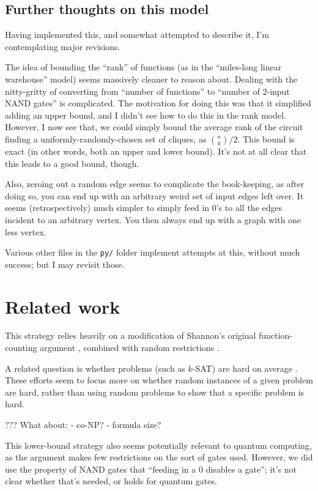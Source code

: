 \documentclass[12pt]{article}
\theoremstyle{definition}
\begin{document}
\subsection{Further thoughts on this model}

Having implemented this, and somewhat attempted to describe it,
I'm contemplating major revisions.

The idea of bounding the ``rank'' of functions (as in the
``miles-long linear warehouse'' model) seems massively cleaner to reason about.
Dealing with the nitty-gritty of converting from ``number of functions''
to ``number of 2-input NAND gates'' is complicated. The motivation
for doing this was that it simplified adding an upper bound, and I
didn't see how to do this in the rank model.
However, I now see that, we could simply bound the
average rank of the circuit finding a uniformly-randomly-chosen set of cliques, as
${n \choose k}/2$. This bound is exact (in other words, both an
upper and lower bound). It's not at all clear that this leads to a good bound, though.

Also, zeroing out a random edge seems to complicate the book-keeping,
as after doing so, you can end up with an arbitrary weird set of
input edges left over. It seems (retrospectively) much simpler to
simply feed in 0's to all the edges incident to an arbitrary vertex.
You then always end up with a graph with one less vertex.

Various other files in the {\tt py/} folder implement attempts at
this, without much success; but I may revisit those.

\section{Related work}

This strategy relies heavily on a modification of Shannon's original
function-counting argument \cite{shannon_synthesis_1949},
combined with random restrictions
\cite{subbotovskaya1963comparison} \cite{hastad1987lower}.

A related question is whether problems
(such as $k$-SAT) are
hard on average \cite{bogdanov2006average}.
These efforts seem to focus more on whether
random
instances of a given problem are hard, rather
than using random problems to show that
a specific problem is hard.

??? What about:
- co-NP?
- formula size?


This lower-bound strategy also seems potentially
relevant to quantum computing,
as the argument makes few restrictions on the sort of gates used.
However, we did use the property of NAND gates that ``feeding in
a 0 disables a gate''; it's not clear whether that's needed,
or holds for quantum gates.
\end{document}
